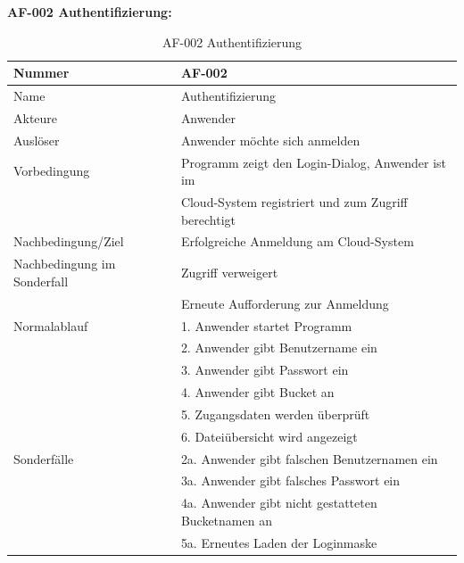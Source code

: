 \documentclass[12pt,a4paper,bibliography=totocnumbered,listof=totocnumbered]{scrartcl}
\begin{document}
\textbf{AF-002 Authentifizierung:}
\begin{table}[!h]
	\centering
	\begin{tabular}{|l|l|}
		\hline
		Nummer & AF-002\\
		\hline
		Name & Authentifizierung\\
		\hline
		Akteure & Anwender\\
		\hline
		Auslöser & Anwender möchte sich anmelden\\
		\hline
		Vorbedingung & Programm zeigt den Login-Dialog, Anwender ist im \\ &  Cloud-System registriert und zum Zugriff berechtigt\\
		\hline
		Nachbedingung/Ziel & Erfolgreiche Anmeldung am Cloud-System \\
		\hline
		Nachbedingung im Sonderfall & Zugriff verweigert\\ & Erneute Aufforderung zur Anmeldung\\
		\hline
		Normalablauf & 1. Anwender startet Programm \\ & 2. Anwender gibt Benutzername ein \\ & 3. Anwender gibt Passwort ein \\ & 4. Anwender gibt Bucket an \\ &5. Zugangsdaten werden überprüft \\ & 6. Dateiübersicht wird angezeigt \\
		\hline
		Sonderfälle & 2a. Anwender gibt falschen Benutzernamen ein \\ & 3a. Anwender gibt falsches Passwort ein \\& 4a. Anwender gibt nicht gestatteten Bucketnamen an\\ & 5a. Erneutes Laden der Loginmaske\\
		\hline
	\end{tabular}
	\caption{AF-002 Authentifizierung}
	\label{tab:AF-002 Authentifizierung}
\end{table}
\pagebreak
\end{document}
